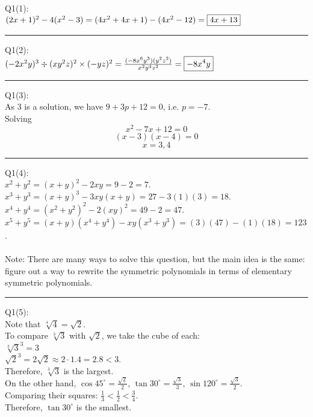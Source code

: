 \documentclass{article}
\begin{document}
\noindent Q1(1):\\
$(2x+1)^2-4(x^2-3)\\
=(4x^2+4x+1)-(4x^2-12)\\
=\boxed{4x+13}$

\vspace{1cm}
\hrule
\vspace{1cm}

\noindent Q1(2):\\
$(-2x^2y)^3\div(xy^2z)^2\times(-yz)^2\\
=\frac{(-8x^6y^3)(y^2z^2)}{x^2y^4z^2}\\
=\boxed{-8x^4y}$

\vspace{1cm}
\hrule
\vspace{1cm}

\noindent Q1(3):\\
As $3$ is a solution, we have $9+3p+12=0$, i.e. $p=\boxed{-7}$.\\
Solving $$x^2-7x+12=0$$
$$(x-3)(x-4)=0$$
$$x=3,\boxed4$$

\vspace{1cm}
\hrule
\vspace{1cm}

\noindent Q1(4):\\
$x^2+y^2=(x+y)^2-2xy=9-2=\boxed7$.\\
$x^3+y^3=(x+y)^3-3xy(x+y)=27-3(1)(3)=18$.\\
$x^4+y^4=(x^2+y^2)^2-2(xy)^2=49-2=47$.\\
$x^5+y^5=(x+y)(x^4+y^4)-xy(x^3+y^3)=(3)(47)-(1)(18)=\boxed{123}$.\\
\\
Note: There are many ways to solve this question, but the main idea is the same: figure out a way to rewrite the symmetric polynomials in terms of elementary symmetric polynomials.

\vspace{1cm}
\hrule
\vspace{1cm}

\noindent Q1(5):\\
Note that $\sqrt[4]{4}=\sqrt{2}$.\\
To compare $\sqrt[3]{3}$ with $\sqrt2$, we take the cube of each:\\
$\sqrt[3]{3}^3=3$\\
$\sqrt{2}^3=2\sqrt2\approx2\cdot1.4=2.8<3$.\\
Therefore, $\boxed{\sqrt[3]{3}}$ is the largest.\\
On the other hand, $\cos45^\circ=\frac{\sqrt2}{2}$, $\tan30^\circ=\frac{\sqrt3}{3}$, $\sin120^\circ=\frac{\sqrt3}{2}$.\\
Comparing their squares: $\frac{1}{3}<\frac{1}{2}<\frac{3}{4}$.\\
Therefore, $\tan30^\circ$ is the smallest.
\end{document}
